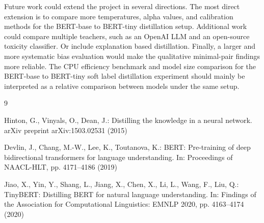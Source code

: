 \documentclass[pdflatex,sn-mathphys-num]{sn-jnl}
\begin{document}
Future work could extend the project in several directions.
The most direct extension is to compare more temperatures, alpha values, and calibration methods for the BERT-base to BERT-tiny distillation setup.
Additional work could compare multiple teachers, such as an OpenAI LLM and an open-source toxicity classifier.
Or include explanation based distillation.
Finally, a larger and more systematic bias evaluation would make the qualitative minimal-pair findings more reliable.
The CPU efficiency benchmark and model size comparison for the BERT-base to BERT-tiny soft label distillation experiment should mainly be interpreted as a relative comparison between models under the same setup.

\begin{thebibliography}{9}

Hinton, G., Vinyals, O., Dean, J.: Distilling the knowledge in a neural network. arXiv preprint arXiv:1503.02531 (2015)

Devlin, J., Chang, M.-W., Lee, K., Toutanova, K.: BERT: Pre-training of deep bidirectional transformers for language understanding. In: Proceedings of NAACL-HLT, pp. 4171--4186 (2019)

Jiao, X., Yin, Y., Shang, L., Jiang, X., Chen, X., Li, L., Wang, F., Liu, Q.: TinyBERT: Distilling BERT for natural language understanding. In: Findings of the Association for Computational Linguistics: EMNLP 2020, pp. 4163--4174 (2020)

\end{thebibliography}
\end{document}

